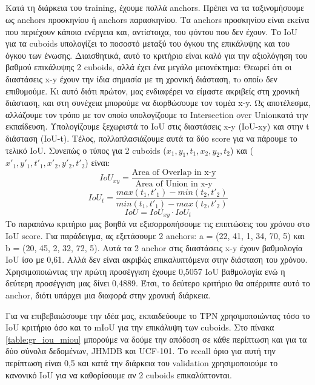 \subsection{ }
Κατά τη διάρκεια του \en training\gr, έχουμε πολλά \en anchors\gr. Πρέπει να τα ταξινομήσουμε ως \en anchors  \gr προσκηνίου ή
\en anchors \gr παρασκηνίου. Τα \en anchors \gr προσκηνίου είναι εκείνα που περιέχουν κάποια ενέργεια και, αντίστοιχα, του φόντου
που δεν έχουν. Tο \en IoU \gr για τα \en cuboids \gr υπολογίζει το ποσοστό μεταξύ του όγκου της επικάλυψης
και του όγκου των ένωσης.
Διαισθητικά, αυτό το κριτήριο είναι καλό για την αξιολόγηση του βαθμού επικάλυψης 2 \en cuboids\gr, αλλά έχει ένα μεγάλο μειονέκτημα:
Θεωρεί ότι οι διαστάσεις \en x-y \gr έχουν την ίδια σημασία με τη χρονική διάσταση, τo οποίo δεν επιθυμούμε. Κι αυτό  διότι
πρώτον, μας ενδιαφέρει να είμαστε ακριβείς στη χρονική διάσταση, και στη συνέχεια μπορούμε να διορθώσουμε τον τομέα \en x-y\gr.
Ως αποτέλεσμα, αλλάζουμε τον τρόπο με τον οποίο υπολογίζουμε το \en Intersection over Union\gr κατά την εκπαίδευση. Υπολογίζουμε ξεχωριστά
το \en IoU \gr στις διαστάσεις \en x-y (IoU-xy) \gr και στην \en t \gr  διάσταση \en (IoU-t)\gr. Τέλος,  πολλαπλασιάζουμε αυτά τα δύο \en score
 \gr για να πάρουμε το τελικό \en IoU\gr.
Συνεπώς ο τύπος για 2 \en cuboids ($x_1, y_1, t_1, x_2, y_2, t_2$) \gr  και \en  ($x'_1, y'_1, t'_1, x'_2, y'_2, t'_2$) \gr είναι:\en
\[ IoU_{xy} = \frac{ \text{Area of Overlap in x-y}} { \text{Area of Union in x-y}}  \]
\[ IoU_t = \frac { max(t_1, t'_1) - min(t_2, t'_2)} {min(t_1,t'_1) - max(t_2,t'_2)} \]
\[ IoU = IoU_{xy} \cdot  IoU_t \]
\gr Το παραπάνω κριτήριο μας βοηθά να εξισορροπήσουμε τις επιπτώσεις του χρόνου στο \en IoU score\gr. Για παράδειγμα, ας εξετάσουμε 2 \en anchors\gr:
\en a = (22, 41, 1, 34, 70, 5) \gr και \en  b = (20, 45, 2, 32, 72, 5)\gr. Αυτά τα 2 \en anchor \gr στις διαστάσεις \en  x-y \gr έχουν βαθμολογία \en IoU \gr ίσο με 0,61.
Αλλά δεν είναι ακριβώς επικαλυπτόμενα στην διάσταση του χρόνου. Χρησιμοποιώντας την πρώτη προσέγγιση έχουμε 0,5057 \en IoU \gr βαθμολογία ενώ η
δεύτερη προσέγγιση μας δίνει 0,4889. Έτσι, το δεύτερο κριτήριο θα απέρριπτε αυτό το \en  anchor\gr, διότι υπάρχει μια διαφορά στην χρονική διάρκεια. \par


Για να επιβεβαιώσουμε την ιδέα μας, εκπαιδεύουμε το \en TPN \gr χρησιμοποιώντας τόσο το \en IoU \gr κριτήριο όσο και το \en mIoU \gr  για την επικάλυψη των \en cuboids\gr.
Στο πίνακα \ref{table:gr_iou_miou} μπορούμε να δούμε την απόδοση σε κάθε περίπτωση και για τα δύο σύνολα δεδομένων, \en JHMDB \gr και \en UCF-101\gr. Το \en recall \gr όριο για αυτή
την περίπτωση είναι 0,5 και κατά την διάρκεια του \en validation \gr χρησιμοποιούμε το κανονικό \en IoU \gr για να καθορίσουμε αν 2 \en cuboids \gr επικαλύπτονται.

